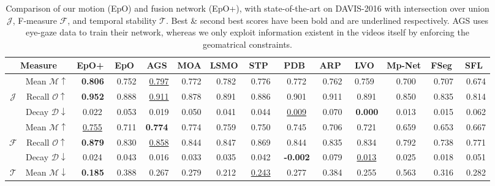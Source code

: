 \documentclass[10pt,twocolumn,letterpaper]{article}
\begin{document}
\setlength{\tabcolsep}{1.4pt}
\begin{table*}[!h]
\begin{center}
\centering
\begin{tabular}{cc|cc|cccccccccc}
\hline
\hline

\multicolumn{2}{c|}{Measure} & EpO+ & EpO & \small{AGS\cite{ags}} & \small{MOA\cite{MotAdapt}} & \small{LSMO\cite{lsmo}}  & \small{STP\cite{STP}} &  \small{PDB\cite{PDB}} & \small{ARP\cite{ARP}} & \small{LVO\cite{visMem}} & \small{Mp-Net\cite{MpNet}} & \small{FSeg\cite{fusionseg}} & \small{SFL\cite{SegFlow}}   \\  
\hline

&Mean $\mathcal{M} \uparrow$ &\bf\ 0.806 & \ 0.752 & \ \underline{0.797} & \  0.772    & \  0.782     & \ 0.776 & \ 0.772 & \ 0.762 & 0.759 & \ 0.700 & \ 0.707 & \ 0.674  \\

$\mathcal{J}$ & Recall $\mathcal{O} \uparrow$   & \bf \ 0.952 & \ 0.888 & \  \underline{0.911}  & \ 0.878     & \ 0.891 & \ 0.886 &  \ 0.901 &   \ 0.911 & \ 0.891 &   \ 0.850 &   \ 0.835 &  \ 0.814  \\

&Decay $\mathcal{D} \downarrow$  &\ 0.022 & \ 0.053 & \ 0.019  & \ 0.050    & \ 0.041     & \ 0.044 & \ \underline{0.009} & \ 0.070 &\bf\ 0.000 &   \ 0.013 &   \ 0.015 & \ 0.062 \\
\hline
& Mean $\mathcal{M} \uparrow$ & \  \underline{0.755} & \ 0.711 & \bf 0.774  & \ 0.774 & \ 0.759 & \ 0.750 &  \ 0.745 &   \ 0.706 & \ 0.721 &   \ 0.659 &   \ 0.653 &   \ 0.667 \\
$\mathcal{F}$ & Recall $\mathcal{O} \uparrow$   &\bf\ 0.879 & \ 0.830 & \ \underline{0.858}  & \ 0.844    & \  0.847  & \ 0.869 & \ 0.844 &   \ 0.835 & \ 0.834 &   \ 0.792  &   \ 0.738 &   \ 0.771  \\
& Decay $\mathcal{D} \downarrow$  & \ 0.024 & \ 0.043  & \ 0.016  & \ 0.033 & \     0.035    & \ 0.042 &\bf\ -0.002 &   \ 0.079 & \ \underline{0.013} &   \ 0.025 &   \ 0.018  &   \ 0.051 \\
\hline
$\mathcal{T}$ & Mean $\mathcal{M} \downarrow$ &\bf\ 0.185 & \ 0.388 & \ 0.267  & \ 0.279     & \  0.212    & \ \underline{0.243} &  \ 0.277 &   \ 0.384 &   \ 0.255 &   \ 0.563 &   \ 0.316 &   \ 0.282  \\
\hline
\hline
\end{tabular}
\vspace{-0.3cm}
\caption{Comparison of our motion (EpO) and fusion network (EpO+), with state-of-the-art on DAVIS-2016 with intersection over union $\mathcal{J}$, F-measure $\mathcal{F}$, and temporal stability $\mathcal{T}$. Best \& second best scores have been bold and are underlined respectively. AGS uses eye-gaze data to train their network, whereas we only exploit information existent in the videos itself by enforcing the geomatrical constraints.\label{tab:comparisonTable2016}} 
\vspace{-0.3in}
\end{center}
\end{table*}
\end{document}

